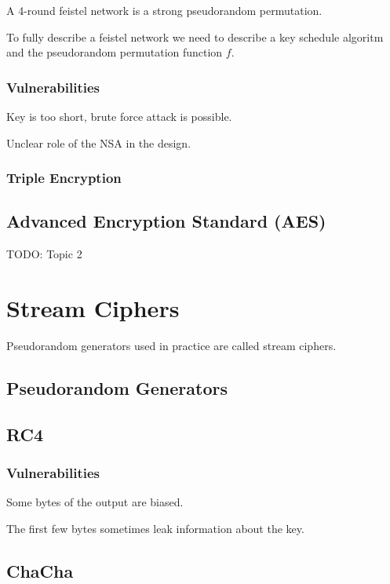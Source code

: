 \documentclass[11pt]{article}
\begin{document}
    A 4-round feistel network is a strong pseudorandom permutation.

    To fully describe a feistel network we need to describe a key schedule algoritm and the pseudorandom permutation function $f$.

    \subsubsection{Vulnerabilities}

    Key is too short, brute force attack is possible.

    Unclear role of the NSA in the design.

    \subsubsection{Triple Encryption}

    \subsection{Advanced Encryption Standard (AES)}

    TODO: Topic 2

    \section{Stream Ciphers}

    Pseudorandom generators used in practice are called stream ciphers.

    \subsection{Pseudorandom Generators}

    \subsection{RC4}

    \subsubsection{Vulnerabilities}

    Some bytes of the output are biased.

    The first few bytes sometimes leak information about the key.

    \subsection{ChaCha}
\end{document}
